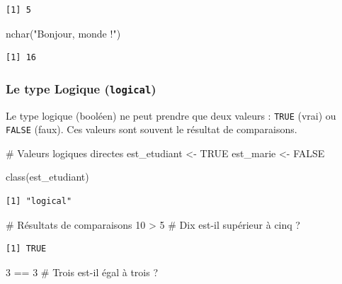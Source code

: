 \documentclass[
  french,
  11pt,
  a4paper,
]{article}
\newenvironment{Shaded}{}{}
\newcommand{\CommentTok}[1]{\textcolor[rgb]{0.42,0.45,0.49}{#1}}
\newcommand{\ConstantTok}[1]{\textcolor[rgb]{0.00,0.36,0.77}{#1}}
\newcommand{\DecValTok}[1]{\textcolor[rgb]{0.00,0.36,0.77}{#1}}
\newcommand{\FunctionTok}[1]{\textcolor[rgb]{0.44,0.26,0.76}{#1}}
\newcommand{\NormalTok}[1]{\textcolor[rgb]{0.14,0.16,0.18}{#1}}
\newcommand{\OtherTok}[1]{\textcolor[rgb]{0.44,0.26,0.76}{#1}}
\newcommand{\SpecialCharTok}[1]{\textcolor[rgb]{0.00,0.36,0.77}{#1}}
\newcommand{\StringTok}[1]{\textcolor[rgb]{0.01,0.18,0.38}{#1}}
\begin{document}
\begin{verbatim}
[1] 5
\end{verbatim}

\begin{Shaded}
\begin{Highlighting}[]
\FunctionTok{nchar}\NormalTok{(}\StringTok{"Bonjour, monde !"}\NormalTok{)}
\end{Highlighting}
\end{Shaded}

\begin{verbatim}
[1] 16
\end{verbatim}

\subsubsection{\texorpdfstring{Le type Logique
(\texttt{logical})}{Le type Logique (logical)}}\label{le-type-logique-logical}

Le type logique (booléen) ne peut prendre que deux valeurs :
\texttt{TRUE} (vrai) ou \texttt{FALSE} (faux). Ces valeurs sont souvent
le résultat de comparaisons.

\begin{Shaded}
\begin{Highlighting}[]
\CommentTok{\# Valeurs logiques directes}
\NormalTok{est\_etudiant }\OtherTok{\textless{}{-}} \ConstantTok{TRUE}
\NormalTok{est\_marie }\OtherTok{\textless{}{-}} \ConstantTok{FALSE}

\FunctionTok{class}\NormalTok{(est\_etudiant)}
\end{Highlighting}
\end{Shaded}

\begin{verbatim}
[1] "logical"
\end{verbatim}

\begin{Shaded}
\begin{Highlighting}[]
\CommentTok{\# Résultats de comparaisons}
\DecValTok{10} \SpecialCharTok{\textgreater{}} \DecValTok{5}      \CommentTok{\# Dix est{-}il supérieur à cinq ?}
\end{Highlighting}
\end{Shaded}

\begin{verbatim}
[1] TRUE
\end{verbatim}

\begin{Shaded}
\begin{Highlighting}[]
\DecValTok{3} \SpecialCharTok{==} \DecValTok{3}      \CommentTok{\# Trois est{-}il égal à trois ?}
\end{Highlighting}
\end{Shaded}
\end{document}
